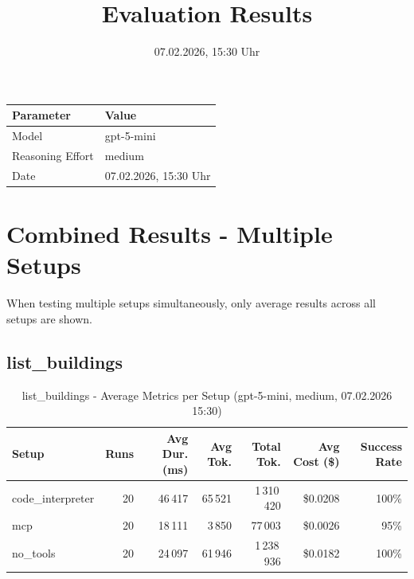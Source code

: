 \documentclass[a4paper,11pt]{article}
\title{Evaluation Results}
\date{07.02.2026, 15:30 Uhr}
\begin{document}
\maketitle

\begin{table}[H]
\centering
\begin{tabular}{l l}
\toprule
\textbf{Parameter} & \textbf{Value} \\
\midrule
Model & gpt-5-mini \\
Reasoning Effort & medium \\
Date & 07.02.2026, 15:30 Uhr \\
\bottomrule
\end{tabular}
\end{table}

\tableofcontents
\clearpage

\section{Combined Results - Multiple Setups}

When testing multiple setups simultaneously, only average results across all setups are shown.

\subsection{list\_buildings}

\begin{table}[H]
\centering
\scriptsize
\caption{list\_buildings - Average Metrics per Setup (gpt-5-mini, medium, 07.02.2026 15:30)}
\label{tab:combined\_list\_buildings\_metrics\_20260207}
\begin{tabular}{l r r r r r r}
\toprule
Setup & Runs & Avg Dur. (ms) & Avg Tok. & Total Tok. & Avg Cost (\$) & Success Rate \\
\midrule
code\_interpreter & 20 & 46\,417 & 65\,521 & 1\,310\,420 & \$0.0208 & 100\% \\
mcp & 20 & 18\,111 & 3\,850 & 77\,003 & \$0.0026 & 95\% \\
no\_tools & 20 & 24\,097 & 61\,946 & 1\,238\,936 & \$0.0182 & 100\% \\
\bottomrule
\end{tabular}
\end{table}
\end{document}
